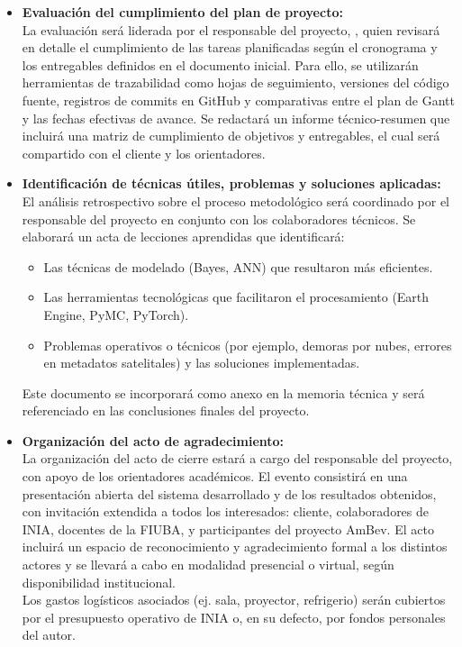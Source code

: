 \documentclass[
11pt, %
]{charter}
\begin{document}
\begin{itemize}
    \item \textbf{Evaluación del cumplimiento del plan de proyecto:}\\
    La evaluación será liderada por el responsable del proyecto, \authorname, quien revisará en detalle el cumplimiento de las tareas planificadas según el cronograma y los entregables definidos en el documento inicial. Para ello, se utilizarán herramientas de trazabilidad como hojas de seguimiento, versiones del código fuente, registros de commits en GitHub y comparativas entre el plan de Gantt y las fechas efectivas de avance. Se redactará un informe técnico-resumen que incluirá una matriz de cumplimiento de objetivos y entregables, el cual será compartido con el cliente y los orientadores.

    \item \textbf{Identificación de técnicas útiles, problemas y soluciones aplicadas:}\\
    El análisis retrospectivo sobre el proceso metodológico será coordinado por el responsable del proyecto en conjunto con los colaboradores técnicos. Se elaborará un acta de lecciones aprendidas que identificará:
    \begin{itemize}
        \item Las técnicas de modelado (Bayes, ANN) que resultaron más eficientes.
        \item Las herramientas tecnológicas que facilitaron el procesamiento (Earth Engine, PyMC, PyTorch).
        \item Problemas operativos o técnicos (por ejemplo, demoras por nubes, errores en metadatos satelitales) y las soluciones implementadas.
    \end{itemize}
    Este documento se incorporará como anexo en la memoria técnica y será referenciado en las conclusiones finales del proyecto.

    \item \textbf{Organización del acto de agradecimiento:}\\
    La organización del acto de cierre estará a cargo del responsable del proyecto, con apoyo de los orientadores académicos. El evento consistirá en una presentación abierta del sistema desarrollado y de los resultados obtenidos, con invitación extendida a todos los interesados: cliente, colaboradores de INIA, docentes de la FIUBA, y participantes del proyecto AmBev. El acto incluirá un espacio de reconocimiento y agradecimiento formal a los distintos actores y se llevará a cabo en modalidad presencial o virtual, según disponibilidad institucional.\\
    Los gastos logísticos asociados (ej. sala, proyector, refrigerio) serán cubiertos por el presupuesto operativo de INIA o, en su defecto, por fondos personales del autor.
\end{itemize}
\end{document}
